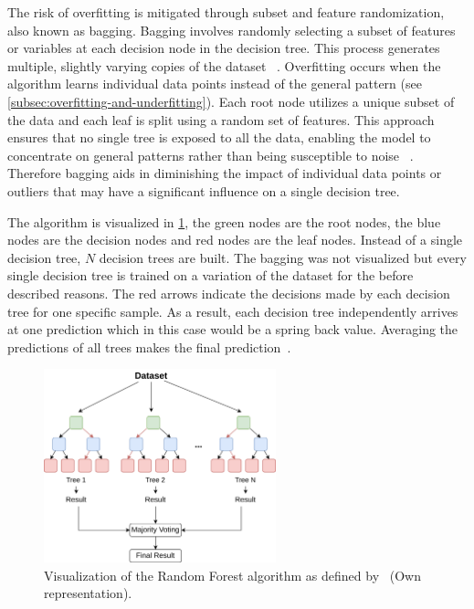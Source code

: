 The risk of overfitting is mitigated through subset and feature randomization, also known as bagging.
Bagging involves randomly selecting a subset of features or variables at each decision node in the decision
tree.
This process generates multiple, slightly varying copies of the dataset
~\cite[pp. 340--341]{gareth2013introduction}.
Overfitting occurs when the algorithm learns individual data points instead of
the general pattern (see \cref{subsec:overfitting-and-underfitting}).
Each root node utilizes a unique subset of the data and each leaf is split using a random set of features.
This approach ensures that no single tree is exposed to all the data, enabling the model to concentrate on general
patterns rather than being susceptible to noise
~\cite[pp. 83--84]{muller2016introduction}.
Therefore bagging aids in diminishing the impact of individual data points or outliers that may have a
significant influence on a single decision tree.

The algorithm is visualized in \cref{fig:rf-example}, the green nodes are the root nodes, the blue
nodes are the decision nodes and red nodes are the leaf nodes.
Instead of a single decision tree, $N$ decision trees are built.
The bagging was not visualized but every single decision tree is trained on a variation of the dataset for the before
described reasons.
The red arrows indicate the decisions made by each decision tree for one specific sample.
As a result, each decision tree independently arrives at one prediction which in this case would be a spring back value.
Averaging the predictions of all trees makes the final prediction~\cite[p. 247]{liu2012new}.

\begin{figure}[h]
    \begin{tcolorbox}[arc=0pt,boxrule=0.5pt]
        \centering
        \includegraphics[width=0.6\textwidth]{chap4/images/random_forest_example}
    \end{tcolorbox}
    \caption{Visualization of the Random Forest algorithm as defined by~\cite[p.1]{breiman2001random} (Own
    representation).
    }
    \label{fig:rf-example}
\end{figure}

